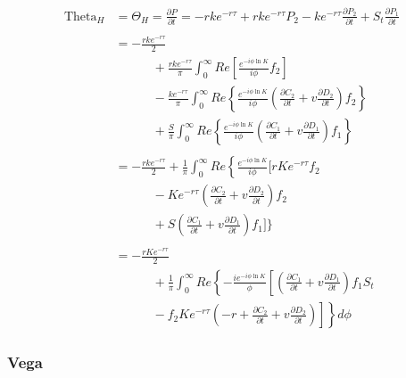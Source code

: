 \documentclass[a4paper]{article}
\begin{document}
\begin{align*}
	\mbox{Theta}_H 
	&
	=
	\Theta_H = \frac{\partial P}{\partial t} = 
	-rke^{-r\tau} 
	+ rke^{-r\tau}P_2 
	- ke^{-r\tau}\frac{\partial P_2}{\partial t}
	+ S_t\frac{\partial P_1}{\partial t}
	\\
	&
	\\
	&
	=
	- \frac{rke^{-r\tau}}{2} \\
	&
	\quad \quad \quad + \frac{rke^{-r\tau}}{\pi} \int_0^{\infty} Re \left[ \frac{e^{-i\phi \ln K}}{i\phi}f_2 \right] \\
	& \quad \quad \quad - \frac{ke^{-r\tau}}{\pi} \int_0^{\infty} Re \left\{ \frac{e^{-i\phi \ln K}}{i\phi} \left( \frac{\partial C_2}{\partial t} + v\frac{\partial D_2}{\partial t} \right) f_2 \right\} \\
	& \quad \quad \quad + \frac{S}{\pi} \int_0^{\infty} Re \left\{ \frac{e^{-i\phi \ln K}}{i\phi} \left( \frac{\partial C_1}{\partial t} + v\frac{\partial D_1}{\partial t} \right) f_1 \right\} 
	\\
	&
	\\
	&
	=
	- \frac{rke^{-r\tau}}{2} + \frac{1}{\pi} \int_0^{\infty} Re \left\{ \frac{e^{-i\phi \ln K}}{i\phi} \bigg[ rKe^{-r\tau} f_2 \right. \\
	& \quad \quad \quad - Ke^{-r\tau} \left(\frac{\partial C_2}{\partial t} + v\frac{\partial D_2}{\partial t} \right) f_2 \\
	& \quad \quad \quad + S \left(\frac{\partial C_1}{\partial t} + v\frac{\partial D_1}{\partial t} \right) f_1  \left. \left. \bigg] \bigg\}
	\\
	&
	\\
	&
	=
	- \frac{rKe^{-r\tau}}{2} \\
	& \quad \quad \quad + \frac{1}{\pi} \int_0^\infty Re \left\{-\frac{ie^{-i\phi \ln K}}{\phi} \left[ \left( \frac{\partial C_1}{\partial t} + v\frac{\partial D_1}{\partial t} \right ) f_1S_t  \\
	& \quad \quad \quad - f_2Ke^{-r\tau}\left. \left.  \left(-r + \frac{\partial C_2}{\partial t} + v\frac{\partial D_2}{\partial t} \right ) \right] \right\} d\phi
\end{align*}







\newpage







\subsubsection*{Vega}
\end{document}
